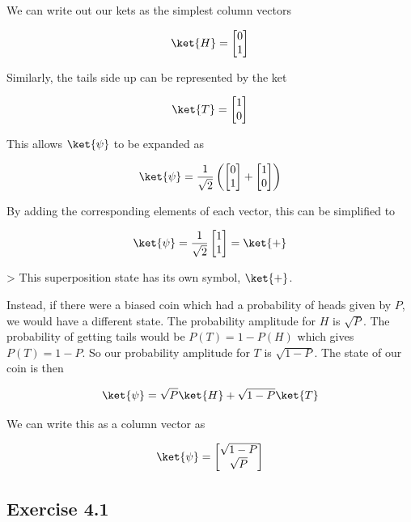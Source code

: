 \documentclass{book}
\begin{document}
We can write out our kets as the simplest column vectors

$$ \ket{H} = 
\begin{bmatrix}
0 \\ 1
\end{bmatrix} $$

Similarly, the tails side up can be represented by the ket

$$
\ket{T} = 
\begin{bmatrix}
1 \\ 0
\end{bmatrix} $$

This allows $\ket{\psi} $ to be expanded as 

$$ \ket{\psi} = \frac{1}{\sqrt{2}}\left(\begin{bmatrix}
0 \\ 1
\end{bmatrix}+ \begin{bmatrix}
1 \\ 0
\end{bmatrix}\right) $$

By adding the corresponding elements of each vector, this can be simplified to

$$ \ket{\psi} = \frac{1}{\sqrt{2}}\begin{bmatrix} 1 \\ 1 \end{bmatrix} = \ket{+}$$

> This superposition state has its own symbol, $\ket{+}$.

Instead, if there were a biased coin which had a probability of heads given by $P$, we would have a different state. The probability amplitude for $H$ is $\sqrt{P}$. The probability of getting tails would be $ P(T) = 1 - P(H)$ which gives $P(T) = 1 -P$. So our probability amplitude for $T$ is $\sqrt{1 - P}$. The state of our coin is then 

$$
\ket{\psi} = \sqrt{P}\ket{H} + \sqrt{1-P}\ket{T}
$$

We can write this as a column vector as

$$
\ket{\psi} = \begin{bmatrix}
\sqrt{1-P} \\ \sqrt{P}
\end{bmatrix}
$$



\subsection{Exercise 4.1 }
\end{document}
